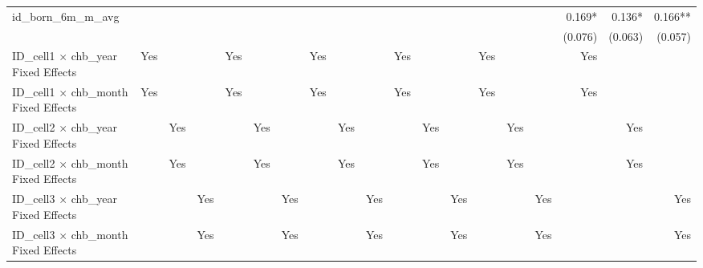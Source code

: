 \begin{tabular}{lrrrrrrrrrrrrrrrrrr}
id\_born\_6m\_m\_avg                        &             &             &             &             &             &             &             &             &             &             &             &             &             &             &             &      0.169* &      0.136* &     0.166** \\ 
                                            &             &             &             &             &             &             &             &             &             &             &             &             &             &             &             &     (0.076) &     (0.063) &     (0.057) \\ 
\midrule
ID\_cell1 $\times$ chb\_year Fixed Effects  &         Yes &             &             &         Yes &             &             &         Yes &             &             &         Yes &             &             &         Yes &             &             &         Yes &             &             \\ 
ID\_cell1 $\times$ chb\_month Fixed Effects &         Yes &             &             &         Yes &             &             &         Yes &             &             &         Yes &             &             &         Yes &             &             &         Yes &             &             \\ 
ID\_cell2 $\times$ chb\_year Fixed Effects  &             &         Yes &             &             &         Yes &             &             &         Yes &             &             &         Yes &             &             &         Yes &             &             &         Yes &             \\ 
ID\_cell2 $\times$ chb\_month Fixed Effects &             &         Yes &             &             &         Yes &             &             &         Yes &             &             &         Yes &             &             &         Yes &             &             &         Yes &             \\ 
ID\_cell3 $\times$ chb\_year Fixed Effects  &             &             &         Yes &             &             &         Yes &             &             &         Yes &             &             &         Yes &             &             &         Yes &             &             &         Yes \\ 
ID\_cell3 $\times$ chb\_month Fixed Effects &             &             &         Yes &             &             &         Yes &             &             &         Yes &             &             &         Yes &             &             &         Yes &             &             &         Yes \\ 

\end{tabular}
